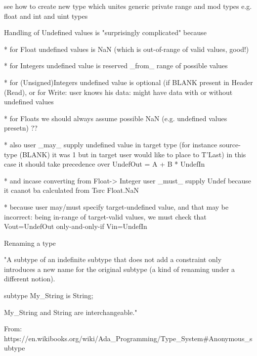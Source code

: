 

see how to create new type which unites generic private range and mod
types e.g. float and int and uint types



Handling of Undefined values is "surprisingly complicated" because

* for Float undefined values is NaN (which is out-of-range of valid values, good!) 

* for Integers undefined value is reserved _from_ range of possible values

* for (Unsigned)Integers undefined value is optional (if BLANK present in Header (Read),
or for Write: user knows his data: might have data with or without undefined values

* for Floats we should always assume possible NaN (e.g. undefined values presetn) ??

* also user _may_ supply undefined value in target type (for instance
source-type (BLANK) it was 1 but in target user would like to place to T'Last)
in this case it should take precedence over UndefOut = A + B * UndefIn

* and incase converting from Float-> Integer user _must_ supply Undef
because it caanot ba calculated from Tsrc Float.NaN

* because user may/must specify target-undefined value, and that may be
incorrect: being in-range of target-valid values, we must check
that Vout=UndefOut only-and-only-if Vin=UndefIn



Renaming a type

"A subtype of an indefinite subtype that does not add a constraint only
introduces a new name for the original subtype (a kind of renaming under a different notion).

subtype My_String is String;

My_String and String are interchangeable."

From: https://en.wikibooks.org/wiki/Ada_Programming/Type_System#Anonymous_subtype


